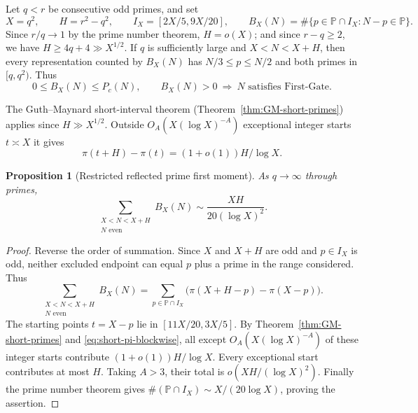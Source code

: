 \documentclass[final,11pt]{elsarticle}
\newtheorem{proposition}[theorem]{Proposition}
\theoremstyle{definition}
\theoremstyle{remark}
\newcommand{\PP}{\mathbb{P}}
\numberwithin{equation}{section}
\begin{document}
Let $q<r$ be consecutive odd primes, and set
\[
 X=q^2,\qquad H=r^2-q^2,\qquad I_X=[2X/5,9X/20],\qquad
 B_X(N)=\#\{p\in\PP\cap I_X:N-p\in\PP\}.
\]
Since $r/q\to1$ by the prime number theorem, $H=o(X)$; and since
$r-q\ge2$, we have $H\ge4q+4\gg X^{1/2}$.  If $q$ is sufficiently
large and $X<N<X+H$, then every representation counted by $B_X(N)$
has $N/3\le p\le N/2$ and both primes in $[q,q^2)$.  Thus
\begin{equation}\label{eq:blockwise-B-P}
 0\le B_X(N)\le P_c(N),\qquad
 B_X(N)>0\ \Longrightarrow\ \text{$N$ satisfies First-Gate}.
\end{equation}

The Guth--Maynard short-interval theorem (Theorem~\ref{thm:GM-short-primes})
applies since $H\gg X^{1/2}$. Outside $O_A(X(\log X)^{-A})$
exceptional integer starts $t\asymp X$ it gives
\begin{equation}\label{eq:short-pi-blockwise}
\pi(t+H)-\pi(t)=(1+o(1))H/\log X.
\end{equation}

\begin{proposition}[Restricted reflected prime first moment]
\label{prop:blockwise-restricted-moment}
As $q\to\infty$ through primes,
\[
 \sum_{\substack{X<N<X+H\\N\text{ even}}}B_X(N)
 \sim \frac{XH}{20(\log X)^2}.
\]
\end{proposition}
\begin{proof}
Reverse the order of summation.  Since $X$ and $X+H$ are odd and
$p\in I_X$ is odd, neither excluded endpoint can equal $p$ plus a
prime in the range considered.  Thus
\[
 \sum_{\substack{X<N<X+H\\N\text{ even}}}B_X(N)
 =\sum_{p\in\PP\cap I_X}
   \bigl(\pi(X+H-p)-\pi(X-p)\bigr).
\]
The starting points $t=X-p$ lie in $[11X/20,3X/5]$.
By Theorem~\ref{thm:GM-short-primes} and
\eqref{eq:short-pi-blockwise}, all except
$O_A(X(\log X)^{-A})$ of these integer starts contribute
$(1+o(1))H/\log X$.  Every exceptional start contributes at most $H$.
Taking $A>3$, their total is $o(XH/(\log X)^2)$.
Finally the prime number theorem gives
$\#(\PP\cap I_X)\sim X/(20\log X)$, proving the assertion.
\end{proof}
\end{document}
